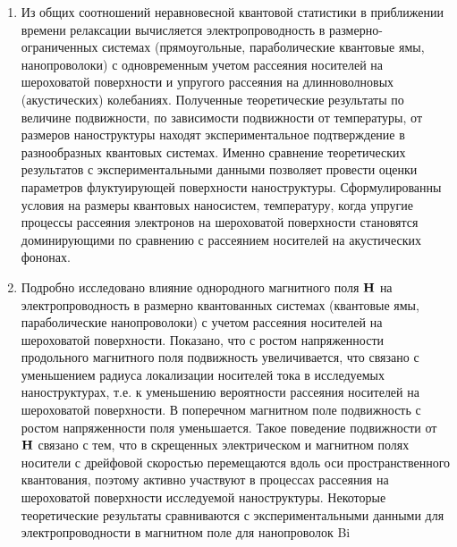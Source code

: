 \begin{enumerate}
  \item Из общих соотношений неравновесной квантовой статистики в приближении времени релаксации вычисляется электропроводность в размерно-ограниченных системах (прямоугольные, параболические квантовые ямы, нанопроволоки) с одновременным учетом рассеяния носителей на шероховатой поверхности и упругого рассеяния на длинноволновых (акустических) колебаниях. Полученные теоретические результаты по величине подвижности, по зависимости подвижности от температуры,  от размеров наноструктуры находят экспериментальное подтверждение в разнообразных квантовых системах. Именно сравнение теоретических результатов с экспериментальными данными позволяет провести оценки параметров флуктуирующей поверхности наноструктуры. Сформулированны условия на размеры квантовых наносистем, температуру, когда упругие процессы рассеяния электронов на шероховатой поверхности становятся доминирующими по сравнению с рассеянием носителей на акустических фононах.
  \item Подробно исследовано влияние однородного магнитного поля $\boldsymbol{\mathbf{H}}$ на электропроводность в размерно квантованных системах (квантовые ямы, параболические нанопроволоки) с учетом рассеяния носителей на шероховатой поверхности. Показано, что с ростом напряженности продольного магнитного поля подвижность увеличивается, что связано с уменьшением радиуса локализации носителей тока в исследуемых наноструктурах, т.е. к уменьшению вероятности рассеяния носителей на шероховатой поверхности. В поперечном магнитном поле подвижность с ростом напряженности поля уменьшается. Такое поведение подвижности от $\boldsymbol{\mathbf{H}}$ связано с тем, что в скрещенных электрическом и магнитном полях носители с дрейфовой скоростью перемещаются вдоль оси пространственного квантования, поэтому активно участвуют в процессах рассеяния на шероховатой поверхности исследуемой наноструктуры. Некоторые теоретические результаты сравниваются с экспериментальными данными для электропроводности в магнитном поле для нанопроволок Bi

\end{enumerate}
